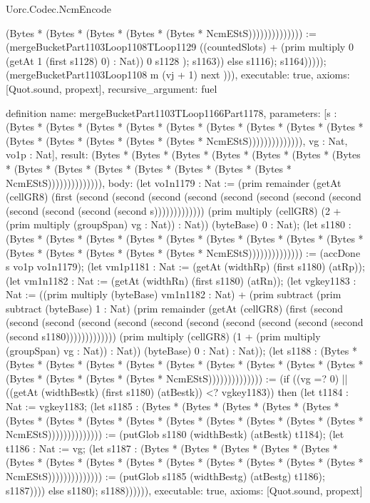 \begin{lexlean}{Uorc.Codec.NcmEncode}
\begin{semanticmodule}
{(Bytes * (Bytes * (Bytes * (Bytes * (Bytes * NcmEStS)))))))))))))) := (mergeBucketPart1103Loop1108TLoop1129 ((countedSlots) + (prim multiply 0 (getAt 1 (first s1128) 0) : Nat)) 0 s1128 ); s1163)) else s1116); s1164))))); (mergeBucketPart1103Loop1108 m (vj + 1) next ))),
  executable: true,
  axioms: [Quot.sound, propext],
  recursive_argument: fuel
}

definition{
  name: mergeBucketPart1103TLoop1166Part1178,
  parameters: [s : (Bytes * (Bytes * (Bytes * (Bytes * (Bytes * (Bytes * (Bytes * (Bytes * (Bytes * (Bytes * (Bytes * (Bytes * (Bytes * (Bytes * NcmEStS)))))))))))))), vg : Nat, vo1p : Nat],
  result: (Bytes * (Bytes * (Bytes * (Bytes * (Bytes * (Bytes * (Bytes * (Bytes * (Bytes * (Bytes * (Bytes * (Bytes * (Bytes * (Bytes * NcmEStS)))))))))))))),
  body: (let vo1n1179 : Nat := (prim remainder (getAt (cellGR8) (first (second (second (second (second (second (second (second (second (second (second (second (second s))))))))))))) (prim multiply (cellGR8) (2 + (prim multiply (groupSpan) vg : Nat)) : Nat)) (byteBase) 0 : Nat); (let s1180 : (Bytes * (Bytes * (Bytes * (Bytes * (Bytes * (Bytes * (Bytes * (Bytes * (Bytes * (Bytes * (Bytes * (Bytes * (Bytes * (Bytes * NcmEStS)))))))))))))) := (accDone s vo1p vo1n1179); (let vm1p1181 : Nat := (getAt (widthRp) (first s1180) (atRp)); (let vm1n1182 : Nat := (getAt (widthRn) (first s1180) (atRn)); (let vgkey1183 : Nat := ((prim multiply (byteBase) vm1n1182 : Nat) + (prim subtract (prim subtract (byteBase) 1 : Nat) (prim remainder (getAt (cellGR8) (first (second (second (second (second (second (second (second (second (second (second (second (second s1180))))))))))))) (prim multiply (cellGR8) (1 + (prim multiply (groupSpan) vg : Nat)) : Nat)) (byteBase) 0 : Nat) : Nat)); (let s1188 : (Bytes * (Bytes * (Bytes * (Bytes * (Bytes * (Bytes * (Bytes * (Bytes * (Bytes * (Bytes * (Bytes * (Bytes * (Bytes * (Bytes * NcmEStS)))))))))))))) := (if ((vg =? 0) || ((getAt (widthBestk) (first s1180) (atBestk)) <? vgkey1183)) then (let t1184 : Nat := vgkey1183; (let s1185 : (Bytes * (Bytes * (Bytes * (Bytes * (Bytes * (Bytes * (Bytes * (Bytes * (Bytes * (Bytes * (Bytes * (Bytes * (Bytes * (Bytes * NcmEStS)))))))))))))) := (putGlob s1180 (widthBestk) (atBestk) t1184); (let t1186 : Nat := vg; (let s1187 : (Bytes * (Bytes * (Bytes * (Bytes * (Bytes * (Bytes * (Bytes * (Bytes * (Bytes * (Bytes * (Bytes * (Bytes * (Bytes * (Bytes * NcmEStS)))))))))))))) := (putGlob s1185 (widthBestg) (atBestg) t1186); s1187)))) else s1180); s1188)))))),
  executable: true,
  axioms: [Quot.sound, propext]
}


\end{semanticmodule}
\end{lexlean}
